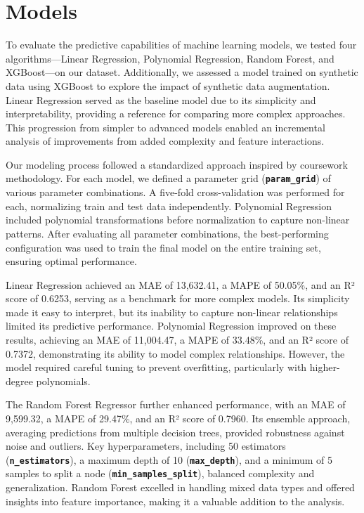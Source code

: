 \documentclass[a4paper,oneside,bibliography=totoc]{scrbook}
\begin{document}
\chapter{Models}
\label{cha:models}

To evaluate the predictive capabilities of machine learning models, we tested four algorithms---Linear Regression, Polynomial Regression, Random Forest, and XGBoost---on our dataset. Additionally, we assessed a model trained on synthetic data using XGBoost to explore the impact of synthetic data augmentation. Linear Regression served as the baseline model due to its simplicity and interpretability, providing a reference for comparing more complex approaches. This progression from simpler to advanced models enabled an incremental analysis of improvements from added complexity and feature interactions.

Our modeling process followed a standardized approach inspired by coursework methodology. For each model, we defined a parameter grid (\textbf{\texttt{param\_grid}}) of various parameter combinations. A five-fold cross-validation was performed for each, normalizing train and test data independently. Polynomial Regression included polynomial transformations before normalization to capture non-linear patterns. After evaluating all parameter combinations, the best-performing configuration was used to train the final model on the entire training set, ensuring optimal performance.

Linear Regression achieved an MAE of 13,632.41, a MAPE of 50.05\%, and an R² score of 0.6253, serving as a benchmark for more complex models. Its simplicity made it easy to interpret, but its inability to capture non-linear relationships limited its predictive performance. Polynomial Regression improved on these results, achieving an MAE of 11,004.47, a MAPE of 33.48\%, and an R² score of 0.7372, demonstrating its ability to model complex relationships. However, the model required careful tuning to prevent overfitting, particularly with higher-degree polynomials.

The Random Forest Regressor further enhanced performance, with an MAE of 9,599.32, a MAPE of 29.47\%, and an R² score of 0.7960. Its ensemble approach, averaging predictions from multiple decision trees, provided robustness against noise and outliers. Key hyperparameters, including 50 estimators (\textbf{\texttt{n\_estimators}}), a maximum depth of 10 (\textbf{\texttt{max\_depth}}), and a minimum of 5 samples to split a node (\textbf{\texttt{min\_samples\_split}}), balanced complexity and generalization. Random Forest excelled in handling mixed data types and offered insights into feature importance, making it a valuable addition to the analysis.
\end{document}

